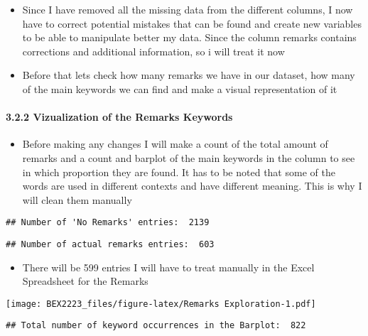 \documentclass[
]{article}
\providecommand{\tightlist}{%
  \setlength{\itemsep}{0pt}\setlength{\parskip}{0pt}}
\begin{document}
\begin{itemize}
\item
  Since I have removed all the missing data from the different columns,
  I now have to correct potential mistakes that can be found and create
  new variables to be able to manipulate better my data. Since the
  column remarks contains corrections and additional information, so i
  will treat it now
\item
  Before that lets check how many remarks we have in our dataset, how
  many of the main keywords we can find and make a visual representation
  of it
\end{itemize}

\hypertarget{vizualization-of-the-remarks-keywords}{%
\paragraph{3.2.2 Vizualization of the Remarks
Keywords}\label{vizualization-of-the-remarks-keywords}}

\begin{itemize}
\tightlist
\item
  Before making any changes I will make a count of the total amount of
  remarks and a count and barplot of the main keywords in the column to
  see in which proportion they are found. It has to be noted that some
  of the words are used in different contexts and have different
  meaning. This is why I will clean them manually
\end{itemize}

\begin{verbatim}
## Number of 'No Remarks' entries:  2139
\end{verbatim}

\begin{verbatim}
## Number of actual remarks entries:  603
\end{verbatim}

\begin{itemize}
\tightlist
\item
  There will be 599 entries I will have to treat manually in the Excel
  Spreadsheet for the Remarks
\end{itemize}

\texttt{[image: BEX2223\_files/figure-latex/Remarks Exploration-1.pdf]}

\begin{verbatim}
## Total number of keyword occurrences in the Barplot:  822
\end{verbatim}
\end{document}
